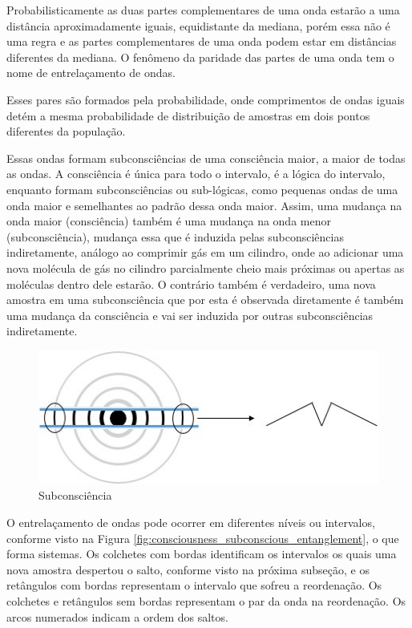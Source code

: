 Probabilisticamente as duas partes complementares de uma onda estarão a uma distância aproximadamente iguais, equidistante da mediana, porém essa não é uma regra e as partes complementares de uma onda podem estar em distâncias diferentes da mediana. O fenômeno da paridade das partes de uma onda tem o nome de entrelaçamento de ondas.

Esses pares são formados pela probabilidade, onde comprimentos de ondas iguais detém a mesma probabilidade de distribuição de amostras em dois pontos diferentes da população. 

Essas ondas formam subconsciências de uma consciência maior, a maior de todas as ondas. A consciência é única para todo o intervalo, é a lógica do intervalo, enquanto formam subconsciências ou sub-lógicas, como pequenas ondas de uma onda maior e semelhantes ao padrão dessa onda maior. Assim, uma mudança na onda maior (consciência) também é uma mudança na onda menor (subconsciência), mudança essa que é induzida pelas subconsciências indiretamente, análogo ao comprimir gás em um cilindro, onde ao adicionar uma nova molécula de gás no cilindro parcialmente cheio mais próximas ou apertas as moléculas dentro dele estarão. O contrário também é verdadeiro, uma nova amostra em uma subconsciência que por esta é observada diretamente é também uma mudança da consciência e vai ser induzida por outras subconsciências indiretamente.
	\begin{figure}[H]
	\caption{Subconsciência}
	\label{fig:consciousness_subconscious}
	\centering
	\includegraphics[scale=.8]{sections/images/consciousness_subconscious.jpg}
	\end{figure}
	
O entrelaçamento de ondas pode ocorrer em diferentes níveis ou intervalos, conforme visto na Figura \ref{fig:consciousness_subconscious_entanglement}, o que forma sistemas. Os colchetes com bordas identificam os intervalos os quais uma nova amostra despertou o salto, conforme visto na próxima subseção, e os retângulos com bordas representam o intervalo que sofreu a reordenação. Os colchetes e retângulos sem bordas representam o par da onda na reordenação. Os arcos numerados indicam a ordem dos saltos.


